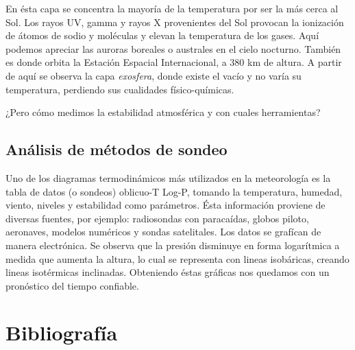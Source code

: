 \documentclass[12pt]{article}
\begin{document}
 En \'esta capa se concentra la mayor\'ia de la temperatura por ser la m\'as cerca al Sol. Los rayos UV, gamma y rayos X provenientes del Sol provocan la ionizaci\'on de \'atomos de sodio y mol\'eculas y elevan la temperatura de los gases. Aqu\'i podemos apreciar las auroras boreales o australes en el cielo nocturno. Tambi\'en es donde orbita la Estaci\'on Espacial Internacional, a 380 km de altura. A partir de aqu\'i se observa la capa \textit{exosfera}, donde existe el vac\'io y no var\'ia su temperatura, perdiendo sus cualidades f\'isico-qu\'imicas. 

¿Pero cómo medimos la estabilidad atmosférica y con cuales herramientas?

        \subsection{An\'alisis de m\'etodos de sondeo}
\noindent Uno de los diagramas termodin\'amicos m\'as utilizados en la meteorolog\'ia es la tabla de datos (o sondeos) oblicuo-T Log-P, tomando la temperatura, humedad, viento, niveles y estabilidad como par\'ametros. \'Esta informaci\'on proviene de diversas fuentes, por ejemplo: radiosondas con paraca\'idas, globos piloto, aeronaves, modelos num\'ericos y sondas satelitales. Los datos se graf\'ican de manera electr\'onica. Se observa que la presi\'on disminuye en forma logar\'itmica a medida que aumenta la altura, lo cual se representa con lineas isob\'aricas, creando lineas isot\'ermicas inclinadas. Obteniendo \'estas gr\'aficas nos quedamos con un pron\'ostico del tiempo confiable.

\section*{Bibliografía}
\end{document}
